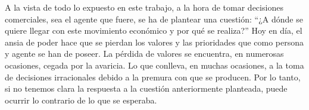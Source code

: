 A la vista de todo lo expuesto en este trabajo, a la hora de tomar decisiones comerciales, sea el agente que fuere, se ha de plantear una cuestión: “¿A dónde se quiere llegar con este movimiento económico y por qué se realiza?” Hoy en día, el ansia de poder hace que se pierdan los valores y las prioridades que como persona y agente se han de poseer. La pérdida de valores se encuentra, en numerosas ocasiones, cegada por la avaricia. Lo que conlleva, en muchas ocasiones, a la toma de decisiones irracionales debido a la premura con que se producen. Por lo tanto, si no tenemos clara la respuesta a la cuestión anteriormente planteada, puede ocurrir lo contrario de lo que se esperaba. 
